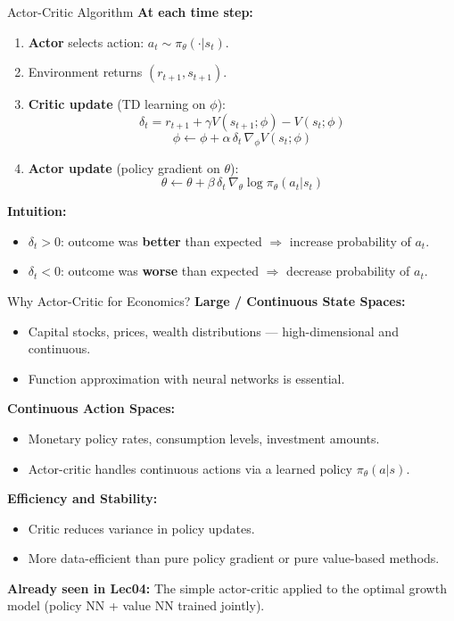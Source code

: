 \documentclass[10pt,english,aspectratio=169]{beamer}
\begin{document}
\begin{frame}{Actor-Critic Algorithm}
\textbf{At each time step:}
\begin{enumerate}
    \item \textbf{Actor} selects action: $a_t \sim \pi_\theta(\cdot | s_t)$.
    \item Environment returns $(r_{t+1}, s_{t+1})$.
    \item \textbf{Critic update} (TD learning on $\phi$):
    \[
        \delta_t = r_{t+1} + \gamma V(s_{t+1};\phi) - V(s_t;\phi)
    \]
    \[
       \phi \gets \phi + \alpha\,\delta_t\,\nabla_\phi V(s_t;\phi)
    \]
    \item \textbf{Actor update} (policy gradient on $\theta$):
    \[
       \theta \gets \theta + \beta\,\delta_t\,\nabla_\theta \log \pi_\theta(a_t | s_t)
    \]
\end{enumerate}

\vspace{0.2cm}
\textbf{Intuition:}
\begin{itemize}
    \item $\delta_t > 0$: outcome was \textbf{better} than expected $\Rightarrow$ increase probability of $a_t$.
    \item $\delta_t < 0$: outcome was \textbf{worse} than expected $\Rightarrow$ decrease probability of $a_t$.
\end{itemize}
\end{frame}


\begin{frame}{Why Actor-Critic for Economics?}
    \textbf{Large / Continuous State Spaces:}
    \begin{itemize}
        \item Capital stocks, prices, wealth distributions --- high-dimensional and continuous.
        \item Function approximation with neural networks is essential.
    \end{itemize}

    \vspace{0.2cm}
    \textbf{Continuous Action Spaces:}
    \begin{itemize}
        \item Monetary policy rates, consumption levels, investment amounts.
        \item Actor-critic handles continuous actions via a learned policy $\pi_\theta(a|s)$.
    \end{itemize}

    \vspace{0.2cm}
    \textbf{Efficiency and Stability:}
    \begin{itemize}
        \item Critic reduces variance in policy updates.
        \item More data-efficient than pure policy gradient or pure value-based methods.
    \end{itemize}

    \vspace{0.2cm}
    \textbf{Already seen in Lec04:} The simple actor-critic applied to the optimal growth model (policy NN + value NN trained jointly).
\end{frame}
\end{document}
